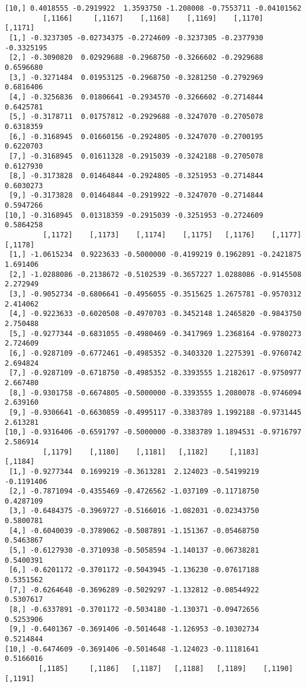 \documentclass[
  letterpaper,
  DIV=11,
  numbers=noendperiod]{scrreprt}
\begin{document}
\begin{verbatim}
[10,] 0.4018555 -0.2919922  1.3593750 -1.208008 -0.7553711 -0.04101562
         [,1166]     [,1167]    [,1168]    [,1169]    [,1170]    [,1171]
 [1,] -0.3237305 -0.02734375 -0.2724609 -0.3237305 -0.2377930 -0.3325195
 [2,] -0.3090820  0.02929688 -0.2968750 -0.3266602 -0.2929688  0.6596680
 [3,] -0.3271484  0.01953125 -0.2968750 -0.3281250 -0.2792969  0.6816406
 [4,] -0.3256836  0.01806641 -0.2934570 -0.3266602 -0.2714844  0.6425781
 [5,] -0.3178711  0.01757812 -0.2929688 -0.3247070 -0.2705078  0.6318359
 [6,] -0.3168945  0.01660156 -0.2924805 -0.3247070 -0.2700195  0.6220703
 [7,] -0.3168945  0.01611328 -0.2915039 -0.3242188 -0.2705078  0.6127930
 [8,] -0.3173828  0.01464844 -0.2924805 -0.3251953 -0.2714844  0.6030273
 [9,] -0.3173828  0.01464844 -0.2919922 -0.3247070 -0.2714844  0.5947266
[10,] -0.3168945  0.01318359 -0.2915039 -0.3251953 -0.2724609  0.5864258
         [,1172]    [,1173]    [,1174]    [,1175]   [,1176]    [,1177]  [,1178]
 [1,] -1.0615234  0.9223633 -0.5000000 -0.4199219 0.1962891 -0.2421875 1.691406
 [2,] -1.0288086 -0.2138672 -0.5102539 -0.3657227 1.0288086 -0.9145508 2.272949
 [3,] -0.9052734 -0.6806641 -0.4956055 -0.3515625 1.2675781 -0.9570312 2.414062
 [4,] -0.9223633 -0.6020508 -0.4970703 -0.3452148 1.2465820 -0.9843750 2.750488
 [5,] -0.9277344 -0.6831055 -0.4980469 -0.3417969 1.2368164 -0.9780273 2.724609
 [6,] -0.9287109 -0.6772461 -0.4985352 -0.3403320 1.2275391 -0.9760742 2.694824
 [7,] -0.9287109 -0.6718750 -0.4985352 -0.3393555 1.2182617 -0.9750977 2.667480
 [8,] -0.9301758 -0.6674805 -0.5000000 -0.3393555 1.2080078 -0.9746094 2.639160
 [9,] -0.9306641 -0.6630859 -0.4995117 -0.3383789 1.1992188 -0.9731445 2.613281
[10,] -0.9316406 -0.6591797 -0.5000000 -0.3383789 1.1894531 -0.9716797 2.586914
         [,1179]    [,1180]    [,1181]   [,1182]     [,1183]    [,1184]
 [1,] -0.9277344  0.1699219 -0.3613281  2.124023 -0.54199219 -0.1191406
 [2,] -0.7871094 -0.4355469 -0.4726562 -1.037109 -0.11718750  0.4287109
 [3,] -0.6484375 -0.3969727 -0.5166016 -1.082031 -0.02343750  0.5800781
 [4,] -0.6040039 -0.3789062 -0.5087891 -1.151367 -0.05468750  0.5463867
 [5,] -0.6127930 -0.3710938 -0.5058594 -1.140137 -0.06738281  0.5400391
 [6,] -0.6201172 -0.3701172 -0.5043945 -1.136230 -0.07617188  0.5351562
 [7,] -0.6264648 -0.3696289 -0.5029297 -1.132812 -0.08544922  0.5307617
 [8,] -0.6337891 -0.3701172 -0.5034180 -1.130371 -0.09472656  0.5253906
 [9,] -0.6401367 -0.3691406 -0.5014648 -1.126953 -0.10302734  0.5214844
[10,] -0.6474609 -0.3691406 -0.5014648 -1.124023 -0.11181641  0.5166016
        [,1185]     [,1186]   [,1187]   [,1188]   [,1189]    [,1190]    [,1191]

\end{verbatim}
\end{document}
